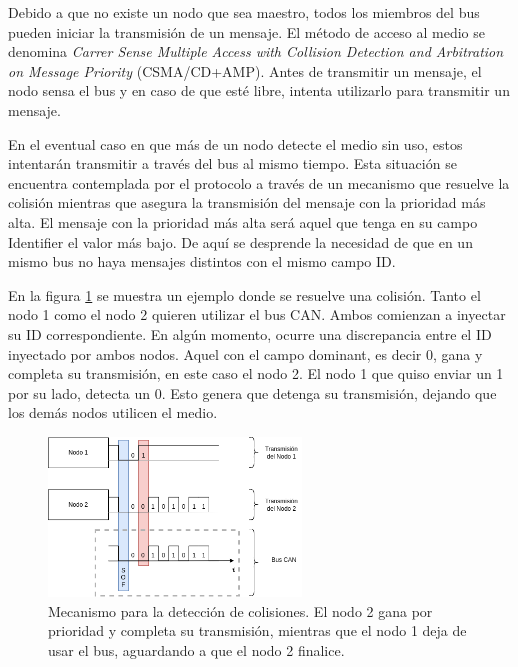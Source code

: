 

Debido a que no existe un nodo que sea maestro, todos los miembros del bus pueden iniciar la transmisión de un mensaje. El método de acceso al medio se denomina \textit{Carrer Sense Multiple Access with Collision Detection and Arbitration on Message Priority} (CSMA/CD+AMP). Antes de transmitir un mensaje, el nodo sensa el bus y en caso de que esté libre, intenta utilizarlo para transmitir un mensaje.


En el eventual caso en que más de un nodo detecte el medio sin uso, estos intentarán transmitir a través del bus al mismo tiempo. Esta situación se encuentra contemplada por el protocolo a través de un mecanismo que resuelve la colisión mientras que asegura la transmisión del mensaje con la prioridad más alta. El mensaje con la prioridad más alta será aquel que tenga en su campo Identifier el valor más bajo. De aquí se desprende la necesidad de que en un mismo bus no haya mensajes distintos con el mismo campo ID.

En la figura \ref{fig:CAN_arbitration} se muestra un ejemplo donde se resuelve una colisión. Tanto el nodo 1 como el nodo 2 quieren utilizar el bus CAN. Ambos comienzan a inyectar su ID correspondiente. En algún momento, ocurre una discrepancia entre el ID inyectado por ambos nodos. Aquel con el campo dominant, es decir 0, gana y completa su transmisión, en este caso el nodo 2. El nodo 1 que quiso enviar un 1 por su lado, detecta un 0. Esto genera que detenga su transmisión, dejando que los demás nodos utilicen el medio.

\begin{figure}[H]
    \centering
    \includegraphics[width=0.6\textwidth]{img/CAN_arbitration.png}
    \caption{Mecanismo para la detección de colisiones. El nodo 2 gana por prioridad y completa su transmisión, mientras que el nodo 1 deja de usar el bus, aguardando a que el nodo 2 finalice.}
    \label{fig:CAN_arbitration}
\end{figure}

